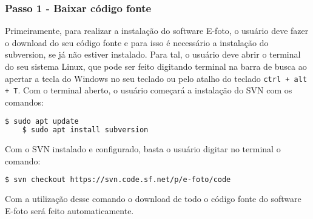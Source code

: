 \subsubsection{Passo 1 - Baixar código fonte}
Primeiramente, para realizar a instalação do software E-foto, o usuário deve fazer o download do seu código fonte e para isso é necessário a instalação do subversion, se já não estiver instalado. Para tal, o usuário deve abrir o terminal do seu sistema Linux, que pode ser feito digitando terminal na barra de busca ao apertar a tecla do Windows no seu teclado ou pelo atalho do teclado \texttt{ctrl + alt + T}. Com o terminal aberto, o usuário começará a instalação do SVN com os comandos: 
\begin{lstlisting}[language=bash]
	$ sudo apt update
	$ sudo apt install subversion
\end{lstlisting}
 
Com o SVN instalado e configurado, basta o usuário digitar no terminal o comando:
\begin{lstlisting}[language=bash]
 $ svn checkout https://svn.code.sf.net/p/e-foto/code
\end{lstlisting}

Com a utilização desse comando o download de todo o código fonte do software E-foto será feito automaticamente.  
    

